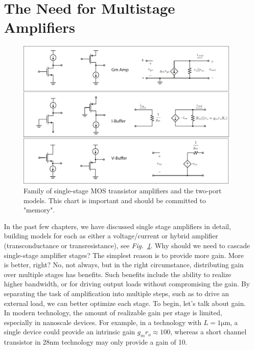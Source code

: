 \section{The Need for Multistage Amplifiers}
\begin{figure}[tb]
\begin{center}
\includegraphics[width=\columnwidth]{ampchart_models}
\end{center}
\caption{Family of single-stage MOS transistor amplifiers and the two-port models.  This chart is important and should be committed to "memory".}
\label{fig:ampchart_models_fig}
\end{figure}
In the past few chapters, we have discussed single stage amplifiers in detail, building models for each as either a voltage/current or hybrid amplifier (transconductance or transresistance), see \emph{Fig.~\ref{fig:ampchart_models_fig}}.  Why should we need to cascade single-stage amplifier stages?  The simplest reason is to provide more gain.   More is better, right? No, not always, but in the right circumstance, distributing gain over multiple stages has benefits. Such benefits include the ability to realize higher bandwidth, or for driving output loads without compromising the gain.  By separating the task of amplification into multiple steps, such as to drive an external load, we can better optimize each stage.
To begin, let's talk about gain.  In modern technology, the amount of realizable gain per stage is  limited, especially in nanoscale devices.  For example, in a technology with $L = 1\mathrm{\mu m}$, a single device could provide an intrinsic gain $g_m r_o \approx 100$, whereas a short channel transistor in 28nm technology may only provide a gain of 10.  
